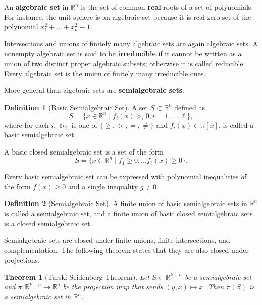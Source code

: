 \documentclass[
]{book}
\newtheorem{theorem}{Theorem}[chapter]
\theoremstyle{definition}
\newtheorem{definition}{Definition}[chapter]
\theoremstyle{definition}
\theoremstyle{definition}
\theoremstyle{definition}
\theoremstyle{remark}
\begin{document}
An \textbf{algebraic set} in \(\mathbb{R}^{n}\) is the set of common \textbf{real} roots of a set of polynomials. For instance, the unit sphere is an algebraic set because it is real zero set of the polynomial \(x_1^2 + \dots + x_n^2 - 1\).

Intersections and unions of finitely many algebraic sets are again algebraic sets. A nonempty algebraic set is said to be \textbf{irreducible} if it cannot be written as a union of two distinct proper algebraic subsets; otherwise it is called reducible. Every algebraic set is the union of finitely many irreducible ones.

More general than algebraic sets are \textbf{semialgebraic sets}.

\begin{definition}[Basic Semialgebraic Set]
\protect\hypertarget{def:BasisSemialgebraic}{}\label{def:BasisSemialgebraic}A set \(S \subset \mathbb{R}^{n}\) defined as
\[
S = \{ x \in \mathbb{R}^{n} \mid f_i(x) \triangleright_i 0, i=1,\dots,\ell  \},
\]
where for each \(i\), \(\triangleright_i\) is one of \(\{ \geq, >, =, \neq \}\) and \(f_i(x) \in \mathbb{R}[x]\), is called a basic semialgebraic set.

A basic closed semialgebraic set is a set of the form
\[
S = \{ x \in \mathbb{R}^{n} \mid f_1\geq 0, \dots f_\ell(x) \geq 0 \}.
\]
\end{definition}

Every basic semialgebraic set can be expressed with polynomial inequalities of the form \(f(x) \geq 0\) and a single inequality \(g \neq 0\).

\begin{definition}[Semialgebraic Set]
\protect\hypertarget{def:SemialgebraicSet}{}\label{def:SemialgebraicSet}A finite union of basic semialgebraic sets in \(\mathbb{R}^{n}\) is called a semialgebraic set, and a finite union of basic closed semialgebraic sets is a closed semialgebraic set.
\end{definition}

Semialgebraic sets are closed under finite unions, finite intersections, and complementation. The following theorem states that they are also closed under projections.

\begin{theorem}[Tarski-Seidenberg Theorem]
\protect\hypertarget{thm:TarskiSeidenberg}{}\label{thm:TarskiSeidenberg}Let \(S \subset \mathbb{R}^{k+n}\) be a semialgebraic set and \(\pi : \mathbb{R}^{k+n} \rightarrow \mathbb{R}^{n}\) be the projection map that sends \((y,x) \mapsto x\). Then \(\pi(S)\) is a semialgebraic set in \(\mathbb{R}^{n}\).
\end{theorem}
\end{document}
